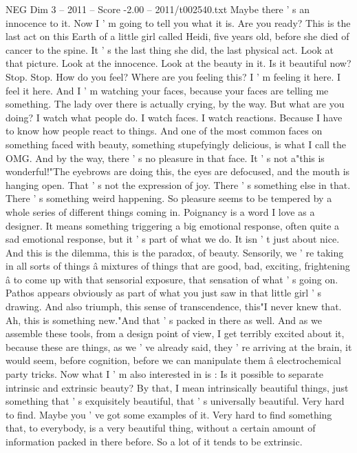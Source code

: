 \begin{textsample}{NEG Dim 3 – 2011 – Score -2.00 – 2011/t002540.txt}
Maybe there ' s an innocence to it.
Now I ' m going to tell you what it is.
Are you ready?
This is the last act on this Earth of a little girl called Heidi, five years old, before she died of cancer to the spine.
It ' s the last thing she did, the last physical act.
Look at that picture.
Look at the innocence.
Look at the beauty in it.
Is it beautiful now?
Stop.
Stop.
How do you feel?
Where are you feeling this?
I ' m feeling it here.
I feel it here.
And I ' m watching your faces, because your faces are telling me something.
The lady over there is actually crying, by the way.
But what are you doing?
I watch what people do.
I watch faces.
I watch reactions.
Because I have to know how people react to things.
And one of the most common faces on something faced with beauty, something stupefyingly delicious, is what I call the OMG.
And by the way, there ' s no pleasure in that face.
It ' s not a"this is wonderful!"The eyebrows are doing this, the eyes are defocused, and the mouth is hanging open.
That ' s not the expression of joy.
There ' s something else in that.
There ' s something weird happening.
So pleasure seems to be tempered by a whole series of different things coming in.
Poignancy is a word I love as a designer.
It means something triggering a big emotional response, often quite a sad emotional response, but it ' s part of what we do.
It isn ' t just about nice.
And this is the dilemma, this is the paradox, of beauty.
Sensorily, we ' re taking in all sorts of things â mixtures of things that are good, bad, exciting, frightening â to come up with that sensorial exposure, that sensation of what ' s going on.
Pathos appears obviously as part of what you just saw in that little girl ' s drawing.
And also triumph, this sense of transcendence, this"I never knew that.
Ah, this is something new."And that ' s packed in there as well.
And as we assemble these tools, from a design point of view, I get terribly excited about it, because these are things, as we ' ve already said, they ' re arriving at the brain, it would seem, before cognition, before we can manipulate them â electrochemical party tricks.
Now what I ' m also interested in is : Is it possible to separate intrinsic and extrinsic beauty?
By that, I mean intrinsically beautiful things, just something that ' s exquisitely beautiful, that ' s universally beautiful.
Very hard to find.
Maybe you ' ve got some examples of it.
Very hard to find something that, to everybody, is a very beautiful thing, without a certain amount of information packed in there before.
So a lot of it tends to be extrinsic.

\end{textsample}
